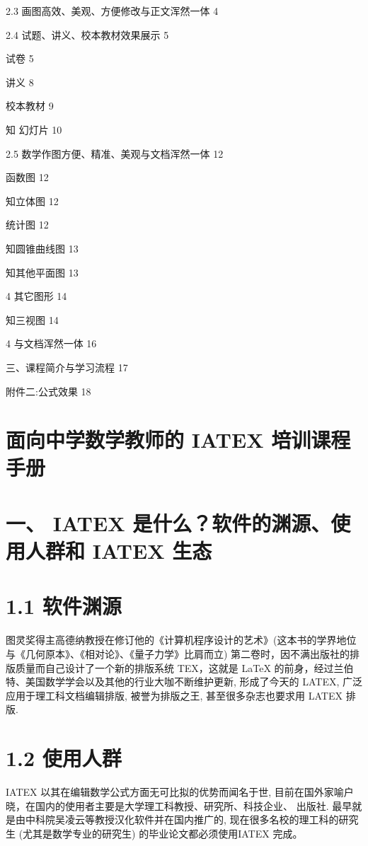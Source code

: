 \documentclass[10pt]{article}
\begin{document}
2.3 画图高效、美观、方便修改与正文浑然一体 4

2.4 试题、讲义、校本教材效果展示 5

试卷 5

讲义 8

校本教材 9

知 幻灯片 10

2.5 数学作图方便、精准、美观与文档浑然一体 12

函数图 12

知立体图 12

统计图 12

知圆锥曲线图 13

知其他平面图 13

4 其它图形 14

知三视图 14

4 与文档浑然一体 16

三、课程简介与学习流程 17

附件二:公式效果 18

\section*{面向中学数学教师的 IATEX 培训课程手册}

\section*{一、 IATEX 是什么？软件的渊源、使用人群和 IATEX 生态}

\section*{1.1 软件渊源}

图灵奖得主高德纳教授在修订他的《计算机程序设计的艺术》(这本书的学界地位与《几何原本》、《相对论》、《量子力学》比肩而立) 第二卷时，因不满出版社的排版质量而自己设计了一个新的排版系统 TEX，这就是 LaTeX 的前身，经过兰伯特、美国数学学会以及其他的行业大咖不断维护更新, 形成了今天的 LATEX, 广泛应用于理工科文档编辑排版, 被誉为排版之王, 甚至很多杂志也要求用 LATEX 排版.

\section*{1.2 使用人群}

IATEX 以其在编辑数学公式方面无可比拟的优势而闻名于世, 目前在国外家喻户晓，在国内的使用者主要是大学理工科教授、研究所、科技企业、 出版社. 最早就是由中科院吴凌云等教授汉化软件并在国内推广的, 现在很多名校的理工科的研究生 (尤其是数学专业的研究生) 的毕业论文都必须使用IATEX 完成。
\end{document}
